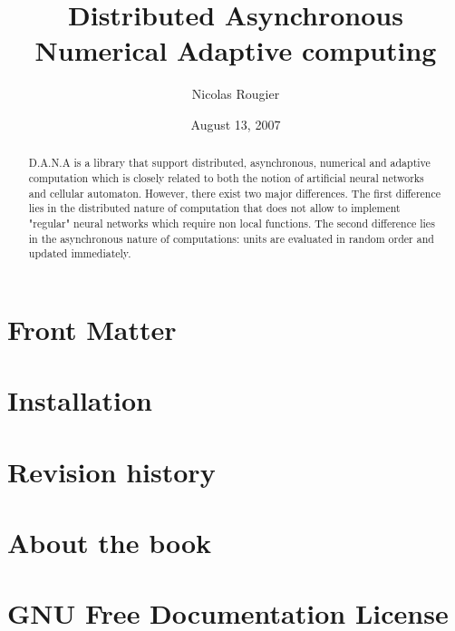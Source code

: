 \documentclass{manual}
\title{Distributed Asynchronous Numerical Adaptive computing}
\author{Nicolas Rougier}
\date{August 13, 2007}
\begin{document}
\maketitle

\ifhtml
\chapter*{Front Matter\label{front}}
\fi



\begin{abstract}
\noindent
D.A.N.A is a library that support distributed, asynchronous, numerical and
adaptive computation which is closely related to both the notion of artificial
neural networks and cellular automaton. However, there exist two major
differences. The first difference lies in the distributed nature of computation
that does not allow to implement "regular" neural networks which require non
local functions. The second difference lies in the asynchronous nature of
computations: units are evaluated in random order and updated immediately.
\end{abstract}

\tableofcontents



\chapter{Installation}



\appendix

\chapter{Revision history}


\chapter{About the book}

\chapter{GNU Free Documentation License \label{License}}



%
%
%

\end{document}
